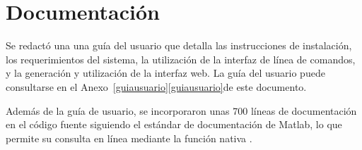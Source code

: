 %
%
\section{Documentación}
%
Se redactó una una guía del usuario que detalla las instrucciones de
instalación, los requerimientos del sistema, la utilización de la
interfaz de línea de comandos, y la generación y utilización de la
interfaz web.
La guía del usuario puede consultarse en el
\iflatexml{}Anexo~\ref{guiausuario}\else\autoref{guiausuario}\fi de
este documento.

Además de la guía de usuario, se incorporaron unas 700 líneas de
documentación en el código fuente siguiendo el estándar de
documentación de Matlab, lo que permite su consulta en línea mediante
la función nativa .
